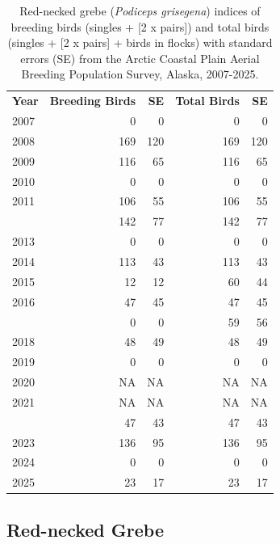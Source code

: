 \documentclass[
]{article}
\begin{document}
\begin{longtable}[t]{lrrrr}

\caption{\label{tbl-RNGR}Red-necked grebe (\emph{Podiceps grisegena})
indices of breeding birds (singles + {[}2 x pairs{]}) and total birds
(singles + {[}2 x pairs{]} + birds in flocks) with standard errors (SE)
from the Arctic Coastal Plain Aerial Breeding Population Survey, Alaska,
2007-2025.}

\tabularnewline

\\
\toprule
\textbf{Year} & \textbf{Breeding Birds} & \textbf{SE} & \textbf{Total Birds} & \textbf{SE}\\
\midrule
2007 & 0 & 0 & 0 & 0\\
2008 & 169 & 120 & 169 & 120\\
2009 & 116 & 65 & 116 & 65\\
2010 & 0 & 0 & 0 & 0\\
2011 & 106 & 55 & 106 & 55\\
\addlinespace
2012 & 142 & 77 & 142 & 77\\
2013 & 0 & 0 & 0 & 0\\
2014 & 113 & 43 & 113 & 43\\
2015 & 12 & 12 & 60 & 44\\
2016 & 47 & 45 & 47 & 45\\
\addlinespace
2017 & 0 & 0 & 59 & 56\\
2018 & 48 & 49 & 48 & 49\\
2019 & 0 & 0 & 0 & 0\\
2020 & NA & NA & NA & NA\\
2021 & NA & NA & NA & NA\\
\addlinespace
2022 & 47 & 43 & 47 & 43\\
2023 & 136 & 95 & 136 & 95\\
2024 & 0 & 0 & 0 & 0\\
2025 & 23 & 17 & 23 & 17\\
\bottomrule

\end{longtable}

\endgroup{}

\newpage{}

\subsection*{Red-necked Grebe}\label{red-necked-grebe-2}
\end{document}
